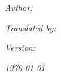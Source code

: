 \begin{center}
\textbf{\large{}}
\par\end{center}{\large \par}

\vspace{6cm}


\begin{center}
{\LARGE{}\reporttitle}
\par\end{center}{\LARGE \par}

\vfill{}



\textit{\emph{\large{}Author: \autor}}{\large \par}

\textit{\emph{\large{}Translated by: \translator}}{\large \par}

\textit{\emph{\large{}Version: \version}}{\large \par}

\vspace{1cm}


\begin{flushright}
\textit{\emph{\today}}
\par\end{flushright}

\pagebreak{}
